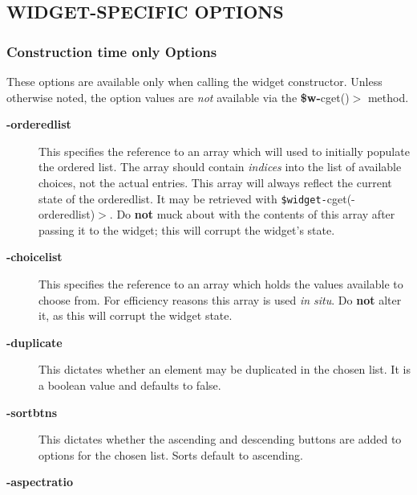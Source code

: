 \documentclass{article}
\begin{document}
\subsection*{WIDGET-SPECIFIC OPTIONS\label{Tk::EnumList_WIDGET-SPECIFIC_OPTIONS}}
\subsubsection*{Construction time only Options\label{Tk::EnumList_Construction_time_only_Options}}


These options are available only when calling the widget constructor.
Unless otherwise noted, the option values are \textit{not} available via the
\textbf{\$w-}cget()$>$ method.

\begin{description}

\item[{\textbf{-orderedlist}}] \mbox{}

This specifies the reference to an array which will used to initially
populate the ordered list.  The array should contain \textit{indices} into
the list of available choices, not the actual entries.  This array
will always reflect the current state of the orderedlist.  It may be
retrieved with \texttt{\$widget-}cget(-orderedlist)$>$.  Do \textbf{not} muck about
with the contents of this array after passing it to the widget; this
will corrupt the widget's state.


\item[{\textbf{-choicelist}}] \mbox{}

This specifies the reference to an array which holds the values
available to choose from.  For efficiency reasons this array is used
\textit{in situ}. Do \textbf{not} alter it, as this will corrupt the widget
state.


\item[{\textbf{-duplicate}}] \mbox{}

This dictates whether an element may be duplicated in the chosen list.
It is a boolean value and defaults to false.


\item[{\textbf{-sortbtns}}] \mbox{}

This dictates whether the ascending and descending buttons are added
to options for the chosen list.  Sorts default to ascending.


\item[{\textbf{-aspectratio}}] \mbox{}


\end{description}
\end{document}
